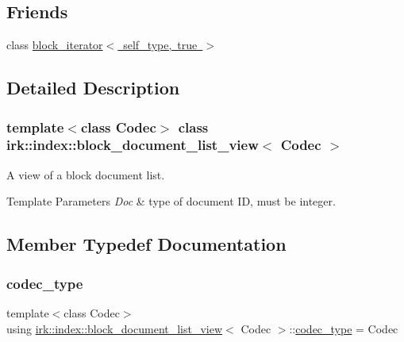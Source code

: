 \subsection*{Friends}
\begin{DoxyCompactItemize}
\item 
class \mbox{\hyperlink{classirk_1_1index_1_1block__document__list__view_a9e9d706e71ebb8b3d20137fb0121c8bd}{block\+\_\+iterator$<$ self\+\_\+type, true $>$}}
\end{DoxyCompactItemize}


\subsection{Detailed Description}
\subsubsection*{template$<$class Codec$>$\newline
class irk\+::index\+::block\+\_\+document\+\_\+list\+\_\+view$<$ Codec $>$}

A view of a block document list. 


\begin{DoxyTemplParams}{Template Parameters}
{\em Doc} & type of document ID, must be integer. \\
\hline
\end{DoxyTemplParams}


\subsection{Member Typedef Documentation}
\mbox{\label{classirk_1_1index_1_1block__document__list__view_ac08980dc0eeb9fea5528fb110a2ce734}} 
\subsubsection{\texorpdfstring{codec\+\_\+type}{codec\_type}}
{\footnotesize\ttfamily template$<$class Codec$>$ \\
using \mbox{\hyperlink{classirk_1_1index_1_1block__document__list__view}{irk\+::index\+::block\+\_\+document\+\_\+list\+\_\+view}}$<$ Codec $>$\+::\mbox{\hyperlink{classirk_1_1index_1_1block__document__list__view_ac08980dc0eeb9fea5528fb110a2ce734}{codec\+\_\+type}} =  Codec}

